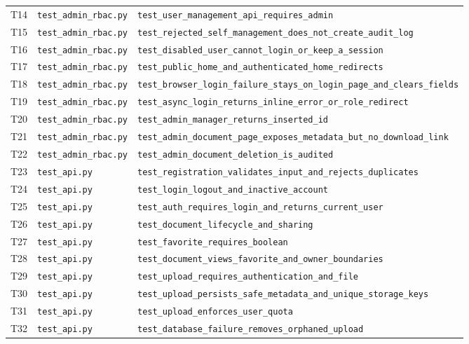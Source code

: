 {\begin{longtable}{P{.8cm}P{4cm}P{8cm}}
T14 & \nolinkurl{test_admin_rbac.py} & \nolinkurl{test_user_management_api_requires_admin} \\
T15 & \nolinkurl{test_admin_rbac.py} & \nolinkurl{test_rejected_self_management_does_not_create_audit_log} \\
T16 & \nolinkurl{test_admin_rbac.py} & \nolinkurl{test_disabled_user_cannot_login_or_keep_a_session} \\
T17 & \nolinkurl{test_admin_rbac.py} & \nolinkurl{test_public_home_and_authenticated_home_redirects} \\
T18 & \nolinkurl{test_admin_rbac.py} & \nolinkurl{test_browser_login_failure_stays_on_login_page_and_clears_fields} \\
T19 & \nolinkurl{test_admin_rbac.py} & \nolinkurl{test_async_login_returns_inline_error_or_role_redirect} \\
T20 & \nolinkurl{test_admin_rbac.py} & \nolinkurl{test_admin_manager_returns_inserted_id} \\
T21 & \nolinkurl{test_admin_rbac.py} & \nolinkurl{test_admin_document_page_exposes_metadata_but_no_download_link} \\
T22 & \nolinkurl{test_admin_rbac.py} & \nolinkurl{test_admin_document_deletion_is_audited} \\
T23 & \nolinkurl{test_api.py} & \nolinkurl{test_registration_validates_input_and_rejects_duplicates} \\
T24 & \nolinkurl{test_api.py} & \nolinkurl{test_login_logout_and_inactive_account} \\
T25 & \nolinkurl{test_api.py} & \nolinkurl{test_auth_requires_login_and_returns_current_user} \\
T26 & \nolinkurl{test_api.py} & \nolinkurl{test_document_lifecycle_and_sharing} \\
T27 & \nolinkurl{test_api.py} & \nolinkurl{test_favorite_requires_boolean} \\
T28 & \nolinkurl{test_api.py} & \nolinkurl{test_document_views_favorite_and_owner_boundaries} \\
T29 & \nolinkurl{test_api.py} & \nolinkurl{test_upload_requires_authentication_and_file} \\
T30 & \nolinkurl{test_api.py} & \nolinkurl{test_upload_persists_safe_metadata_and_unique_storage_keys} \\
T31 & \nolinkurl{test_api.py} & \nolinkurl{test_upload_enforces_user_quota} \\
T32 & \nolinkurl{test_api.py} & \nolinkurl{test_database_failure_removes_orphaned_upload} \\

\end{longtable}}
